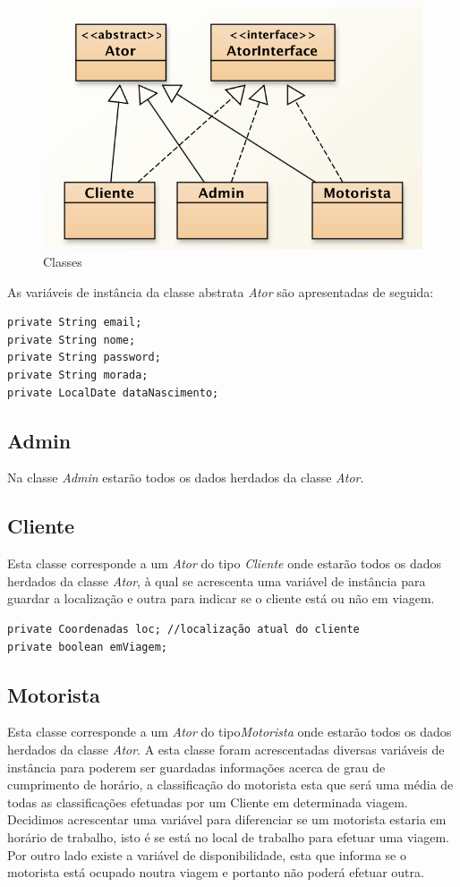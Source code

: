 \begin{figure}[htpb]
	\centering
	\includegraphics[scale=0.6]{imagem/atores}
	\caption{Classes }
	\label{p2:fig:p2_atoresr}
\end{figure}

As variáveis de instância da classe abstrata \textit{Ator} são apresentadas de seguida: 
\begin{verbatim}
private String email; 
private String nome; 
private String password; 
private String morada; 
private LocalDate dataNascimento; 
\end{verbatim}


\subsection{Admin}

Na classe \textit{Admin} estarão todos os dados herdados da classe \textit{Ator}. 


\subsection{Cliente}
Esta classe corresponde a um \textit{Ator} do tipo \textit{Cliente} onde estarão todos os dados herdados da classe \textit{Ator}, à qual se acrescenta uma variável de instância para guardar a localização e outra para indicar se o cliente está ou não em viagem. 
\begin{verbatim}
private Coordenadas loc; //localização atual do cliente
private boolean emViagem;
\end{verbatim}
\subsection{Motorista}
Esta classe corresponde a um \textit{Ator} do tipo\textit{Motorista} onde estarão todos os dados herdados da classe \textit{Ator}. A esta classe foram acrescentadas diversas variáveis de instância para poderem ser guardadas informações acerca de grau de cumprimento de horário, a classificação do motorista esta que será uma média de todas as classificações efetuadas por um Cliente em determinada viagem. 
Decidimos acrescentar uma variável para diferenciar se um motorista estaria em horário de trabalho, isto é se está no local de trabalho para efetuar uma viagem. Por outro lado existe a variável de disponibilidade, esta que informa se o motorista está ocupado noutra viagem e portanto não poderá efetuar outra. 

